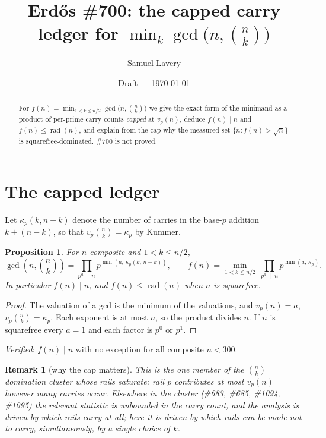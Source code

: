 \documentclass[11pt]{article}
\title{Erd\H{o}s \#700: the capped carry ledger for
$\min_k\gcd\bigl(n,\binom nk\bigr)$}
\author{Samuel Lavery}
\date{Draft --- \today}
\newtheorem{proposition}[theorem]{Proposition}
\newtheorem{remark}[theorem]{Remark}
\DeclareMathOperator{\rad}{rad}
\begin{document}
\maketitle

\begin{abstract}
For $f(n)=\min_{1<k\le n/2}\gcd\bigl(n,\binom nk\bigr)$ we give the exact form of the
minimand as a product of per-prime carry counts \emph{capped} at $v_p(n)$, deduce
$f(n)\mid n$ and $f(n)\le\rad(n)$, and explain from the cap why the measured set
$\{n:f(n)>\sqrt n\}$ is squarefree-dominated.  \#700 is not proved.
\end{abstract}

\section{The capped ledger}
Let $\kappa_p(k,n-k)$ denote the number of carries in the base-$p$ addition $k+(n-k)$, so
that $v_p\binom nk=\kappa_p$ by Kummer.

\begin{proposition}\label{prop:capped}
For $n$ composite and $1<k\le n/2$,
\[
  \gcd\!\left(n,\binom nk\right)=\prod_{p^{a}\,\|\,n}p^{\min\left(a,\ \kappa_p(k,\,n-k)\right)},
  \qquad
  f(n)=\min_{1<k\le n/2}\ \prod_{p^{a}\,\|\,n}p^{\min(a,\,\kappa_p)} .
\]
In particular $f(n)\mid n$, and $f(n)\le\rad(n)$ when $n$ is squarefree.
\end{proposition}

\begin{proof}
The valuation of a gcd is the minimum of the valuations, and $v_p(n)=a$,
$v_p\binom nk=\kappa_p$.  Each exponent is at most $a$, so the product divides $n$.  If $n$
is squarefree every $a=1$ and each factor is $p^{0}$ or $p^{1}$.
\end{proof}

\emph{Verified}: $f(n)\mid n$ with no exception for all composite $n<300$.

\begin{remark}[why the cap matters]
This is the one member of the $\binom nk$ domination cluster whose rails \emph{saturate}:
rail $p$ contributes at most $v_p(n)$ however many carries occur.  Elsewhere in the cluster
(\#683, \#685, \#1094, \#1095) the relevant statistic is unbounded in the carry count, and
the analysis is driven by which rails carry at all; here it is driven by which rails can be
made \emph{not} to carry, simultaneously, by a single choice of $k$.
\end{remark}
\end{document}
